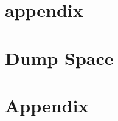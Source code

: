 \documentclass[12pt]{book}
\begin{document}




\part{appendix}




\part{Dump Space}






\part{Appendix}





%





\backmatter 


\printindex



%
%
%


{\scriptsize
	}
%
\end{document}
